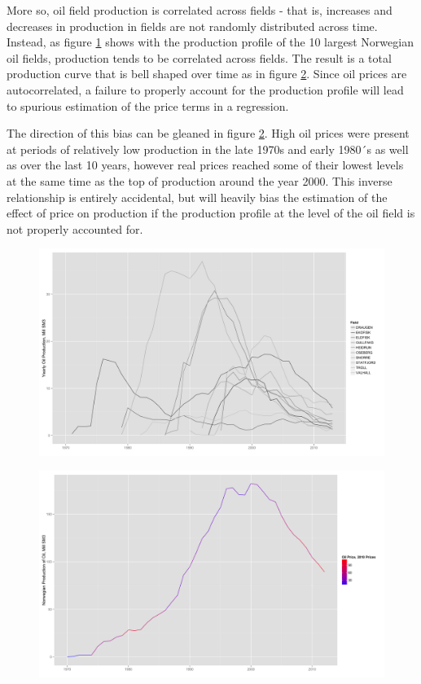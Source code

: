 \documentclass[12pt]{article}
\begin{document}
More so, oil field production is correlated across fields - that is, increases and decreases in production in fields are not randomly distributed across time.  Instead, as figure \ref{top10_production} shows with the production profile of the 10 largest Norwegian oil fields, production tends to be correlated across fields.  The result is a total production curve that is bell shaped over time as in figure \ref{oil_decline}.  Since oil prices are autocorrelated, a failure to properly account for the production profile will lead to spurious estimation of the price terms in a regression.  

The direction of this bias can be gleaned in figure \ref{oil_decline}.  High oil prices were present at periods of relatively low production in the late 1970s and early 1980´s as well as over the last 10 years, however real prices reached some of their lowest levels at the same time as the top of production around the year 2000.  This inverse relationship is entirely accidental, but will heavily bias the estimation of the effect of price on production if the production profile at the level of the oil field is not properly accounted for.  

\begin{figure}
	\includegraphics[width=1\textwidth]{figures/top10_production_print.png}
	\caption{}
	\label{top10_production}	
	\end{figure}

\begin{figure}
	\includegraphics[width=1\textwidth]{figures/oil_decline_print.png}
	\caption{}
	\label{oil_decline}
\end{figure}
\end{document}
